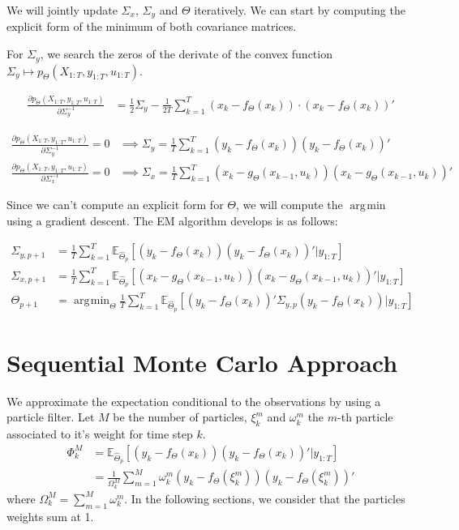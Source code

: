\documentclass[10pt,a4paper]{report}
\DeclareMathOperator*{\argmin}{\arg\!\min}
\begin{document}
We will jointly update $\Sigma_x$, $\Sigma_y$ and $\Theta$ iteratively. We can start by computing the explicit form of the minimum of both covariance matrices.

For $\Sigma_y$, we search the zeros of the derivate of the convex function $\Sigma_y \mapsto p_{\Theta}(X_{1:T}, y_{1:T}, u_{1:T})$.

\begin{align*}
    \frac{\partial p_{\Theta}(X_{1:T}, y_{1:T}, u_{1:T})}{\partial \Sigma_y^{-1}} & = \frac{1}{2} \Sigma_y - \frac{1}{2T} \sum_{k=1}^T (x_k - f_{\Theta}(x_{k})) \cdot (x_k - f_{\Theta}(x_{k}))'
\end{align*}

\begin{align*}
    \frac{\partial p_{\Theta}(X_{1:T}, y_{1:T}, u_{1:T})}{\partial \Sigma_y^{-1}} = 0 & \implies \Sigma_y = \frac{1}{T}\sum_{k=1}^T (y_k - f_{\Theta}(x_k))(y_k - f_{\Theta}(x_k))'                   \\
    \frac{\partial p_{\Theta}(X_{1:T}, y_{1:T}, u_{1:T})}{\partial \Sigma_x^{-1}} = 0 & \implies \Sigma_x = \frac{1}{T}\sum_{k=1}^T (x_k - g_{\Theta}(x_{k-1}, u_k))(x_k - g_{\Theta}(x_{k-1}, u_k))'
\end{align*}

Since we can't compute an explicit form for $\Theta$, we will compute the $\argmin$ using a gradient descent. The EM algorithm develops is as follows:

\begin{align*}
    \Sigma_{y, p+1} & = \frac{1}{T}\sum_{k=1}^T \mathbb{E}_{\hat \Theta_p} \left[ (y_k - f_{\Theta}(x_k))(y_k - f_{\Theta}(x_k))' | y_{1:T} \right]                                 \\
    \Sigma_{x, p+1} & = \frac{1}{T}\sum_{k=1}^T \mathbb{E}_{\hat \Theta_p} \left[ (x_k - g_{\Theta}(x_{k-1}, u_k))(x_k - g_{\Theta}(x_{k-1}, u_k))' | y_{1:T} \right]               \\
    \Theta_{p+1}    & = \argmin_{\Theta} \frac{1}{T}\sum_{k=1}^T \mathbb{E}_{\hat \Theta_p} \left[ (y_k - f_{\Theta}(x_k))' \Sigma_{y, p} (y_k - f_{\Theta}(x_k)) | y_{1:T} \right]
\end{align*}

\section{Sequential Monte Carlo Approach}
We approximate the expectation conditional to the observations by using a particle filter. Let $M$ be the number of particles, $\xi_k^m$ and $\omega_k^m$ the $m$-th particle associated to it's weight for time step $k$.
\begin{align*}
    \Phi_k^M & = \mathbb{E}_{\hat \Theta_p} \left[ (y_k - f_{\Theta}(x_k))(y_k - f_{\Theta}(x_k))' | y_{1:T} \right]  \\
             & = \frac{1}{\Omega_k^M} \sum_{m=1}^M \omega_k^m (y_k - f_{\Theta}(\xi_k^m))(y_k - f_{\Theta}(\xi_k^m))'
\end{align*}
where $\Omega_k^M = \sum_{m=1}^M \omega_k^m$. In the following sections, we consider that the particles weights sum at 1.
\end{document}
